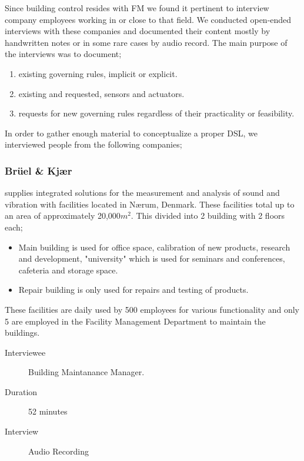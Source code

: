 Since building control resides with FM we found it pertinent to interview company employees working in or close to that field. We conducted open-ended interviews with these companies and documented their content mostly by handwritten notes or in some rare cases by audio record. The main purpose of the interviews was to document;

\begin{enumerate}
	\item existing governing rules, implicit or explicit.
	\item existing and requested, sensors and actuators.
	\item requests for new governing rules regardless of their practicality or feasibility.
\end{enumerate}

In order to gather enough material to conceptualize a proper DSL, we interviewed people from the following companies;

\subsubsection{Br\"{u}el \& Kj\ae r} supplies integrated solutions for the measurement and analysis of sound and vibration with facilities located in N\ae rum, Denmark. These facilities total up to an area of approximately 20,000$m^2$. This divided into 2 building with 2 floors each; 
\begin{itemize}
	\item Main building is used for office space, calibration of new products, research and development, "university" which is used for seminars and conferences, cafeteria and storage space.
	\item Repair building is only used for repairs and testing of products.
\end{itemize}	
These facilities are daily used by 500 employees for various functionality and only 5 are employed in the Facility Management Department to maintain the buildings.
\begin{description}
	\item[Interviewee] Building Maintanance Manager.
	\item[Duration] 52 minutes
	\item[Interview] Audio Recording
\end{description}

